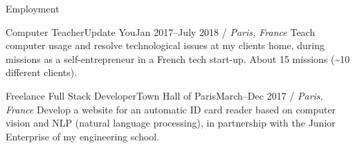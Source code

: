 \documentclass[]{mcdowellcv}
\begin{document}
\begin{cvsection}{Employment}
        \begin{cvsubsection}{Computer Teacher}{Update You}{Jan 2017--July 2018 / \textit{Paris, France}}
            Teach computer usage and resolve technological issues at my clients home, during missions as a self-entrepreneur in a French tech start-up.
            About 15 missions (\textasciitilde 10 different clients).
        \end{cvsubsection}

        \begin{cvsubsection}{Freelance Full Stack Developer}{Town Hall of Paris}{March--Dec 2017 / \textit{Paris, France}}
            Develop a website for an automatic ID card reader based on computer vision and NLP (natural language processing), in partnership with the Junior Enterprise of my engineering school.
        \end{cvsubsection}

    \end{cvsection}
\end{document}
